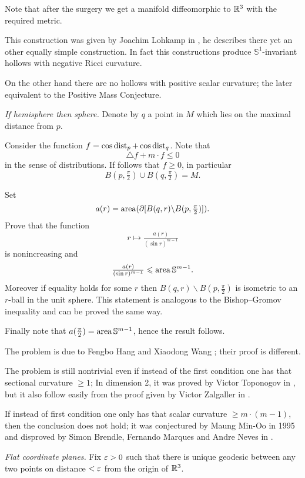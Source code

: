 Note that after the surgery we get a manifold diffeomorphic to $\mathbb{R}^3$ with the required metric.

This construction was given by Joachim Lohkamp in \cite{lohkamp},
he describes there yet an other equally simple construction.
In fact this  constructions produce 
$\mathbb{S}^1$-invariant hollows 
with negative Ricci curvature.

On the other hand there are no hollows with positive scalar curvature;
the later equivalent to the Positive Mass Conjecture.

\textit{If hemisphere then sphere.}
Denote by $q$ a point in $M$ which lies on the maximal distance from $p$.

Consider the function $f=\cos \operatorname{\rm dist}_p+\cos\operatorname{\rm dist}_q$.
Note that 
\[\triangle f+m\cdot f\le 0\] 
in the sense of distributions.
If follows that $f\ge 0$, in particular 
\[B(p,\tfrac\pi2)\cup B(q,\tfrac\pi2)=M.\]

Set \[a(r)=\operatorname{\rm area}(\partial [B(q,r)\backslash B(p,\tfrac\pi2)]).\]
Prove that the function
\[r \mapsto \tfrac{a(r)}{(\sin r)^{m-1}}\]
is nonincreasing 
and 
\[\tfrac{a(r)}{(\sin r)^{m-1}}\leqslant\operatorname{\rm area}\mathbb{S}^{m-1}.\]
Moreover if equality holds for some $r$ then $B(q,r)\backslash B(p,\tfrac\pi2)$ is isometric to an $r$-ball in the unit sphere.
This statement is analogous to the Bishop--Gromov inequality and can be proved the same way.

Finally note that $a(\tfrac\pi2)=\operatorname{\rm area}\mathbb{S}^{m-1}$,
hence the result follows.
 

The problem is due to Fengbo Hang %
and Xiaodong Wang %
\cite{hang-wang};
their proof is different.

The problem is still nontrivial 
even if instead of the first condition one has that sectional curvature $\ge 1$;
In dimension 2, 
it was proved by Victor Toponogov in \cite{toponogov},
but it also follow easily from the proof given by Victor Zalgaller in \cite{zalgaller-shperical-polygon}.


If instead of first condition one only has that scalar curvature $\ge m\cdot(m-1)$, then the conclusion does not hold; 
it was conjectured by Maung Min-Oo in 1995 
and disproved by
Simon Brendle,
Fernando Marques
and Andre Neves in \cite{brendle-marques-neve}.



\textit{Flat coordinate planes.}
Fix $\varepsilon>0$ such that there is unique geodesic between any two points on distance $<\varepsilon$ from the origin of $\mathbb{R}^3$.

